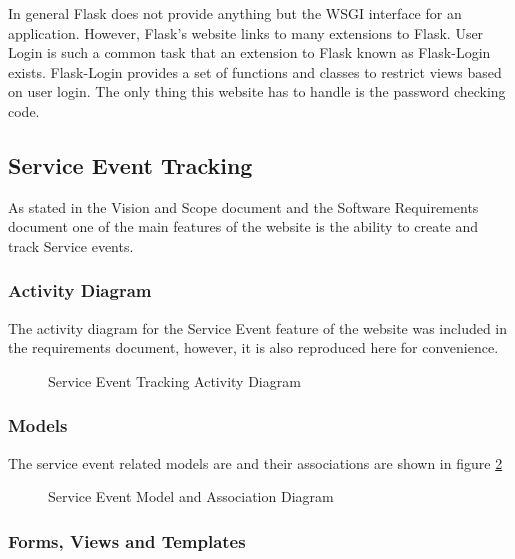 \documentclass{article}
\begin{document}
In general Flask does not provide anything but the WSGI interface for an application. However, Flask's website links to many
extensions to Flask. User Login is such a common task that an extension to Flask known as Flask-Login exists. \cite{_flask-login} Flask-Login provides a set of functions and classes to restrict views based on user login. The only thing this website has to handle is the password checking code.

\subsection{Service Event Tracking}

As stated in the Vision and Scope document and the Software Requirements document one of the main features of the website is the ability to create and track Service events.

\subsubsection{Activity Diagram}

The activity diagram for the Service Event feature of the website was included in the requirements document, however, it is also reproduced here for convenience.

\FloatBarrier
\begin{figure}[h!]
\centering
{}
\caption{Service Event Tracking Activity Diagram}
\label{fig:serviceEventTrackingActivityDiagram}
\end{figure}
\FloatBarrier

\subsubsection{Models}

The service event related models are and their associations are shown in figure \ref{fig:serviceEventModelDiagram}

\FloatBarrier
\begin{figure}[h!]
\centering
{}
\caption{Service Event Model and Association Diagram}
\label{fig:serviceEventModelDiagram}
\end{figure}
\FloatBarrier

\subsubsection{Forms, Views and Templates}
\end{document}
